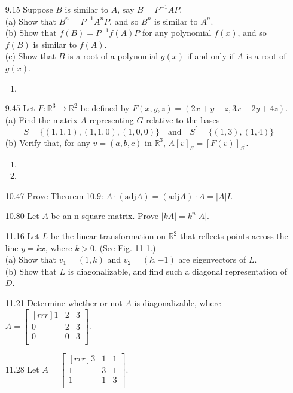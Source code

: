 \documentclass[12pt]{article}
\theoremstyle{plain}
\theoremstyle{definition}
\theoremstyle{plain}
\begin{document}
\begin{enumerate}
\item[9.15]Suppose $B$ is similar to $A$, say $B=P^{-1}AP$.\\
(a) Show that $B^n=P^{-1}A^nP$, and so $B^n$ is similar to $A^n$.\\
(b) Show that $f(B)=P^{-1}f(A)P$ for any polynomial $f(x)$, and so $f(B)$ is similar to $f(A)$.\\
(c) Show that $B$ is a root of a polynomial $g(x)$ if and only if $A$ is a root of $g(x)$.
	\begin{enumerate}
	\item
	\end{enumerate}
\item[9.45]Let $F:\mathbb{R}^3\rightarrow\mathbb{R}^2$ be defined by $F(x,y,z)=(2x+y-z,3x-2y+4z)$.\\
(a) Find the matrix $A$ representing $G$ relative to the bases
\[ S=\{(1,1,1),(1,1,0),(1,0,0)\} \quad \mathrm{and} \quad S^\prime = \{(1,3),(1,4)\} \]
(b) Verify that, for any $v=(a,b,c)$ in $\mathbb{R}^3$, $A[v]_S=[F(v)]_{S^\prime}$.
	\begin{enumerate}
	\item
	\item
	\end{enumerate}
\item[10.47]Prove Theorem 10.9: $A\cdot (\mathrm{adj}A)=(\mathrm{adj}A)\cdot A = |A|I$.
\item[10.80]Let $A$ be an n-square matrix. Prove $|kA|=k^n|A|$.
\item[11.16]Let $L$ be the linear transformation on $\mathbb{R}^2$ that reflects points across the line $y=kx$, where $k > 0$. (See Fig. 11-1.)\\
(a) Show that $v_1=(1,k)$ and $v_2=(k,-1)$ are eigenvectors of $L$.\\
(b) Show that $L$ is diagonalizable, and find such a diagonal representation of $D$.
\item[11.21]Determine whether or not $A$ is diagonalizable, where $A=\begin{bmatrix}[rrr]1&2&3\\0&2&3\\0&0&3\\\end{bmatrix}$.
\item[11.28]Let $A=\begin{bmatrix}[rrr]3&1&1\\1&3&1\\1&1&3\\\end{bmatrix}$.\\

\end{enumerate}
\end{document}
